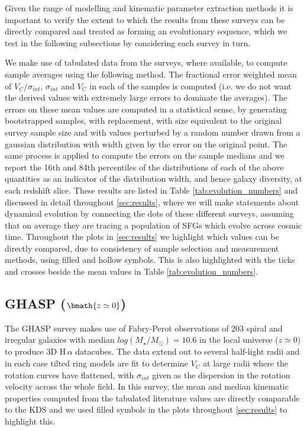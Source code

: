 \documentclass[fleqn,usenatbib]{mnras}
\begin{document}
Given the range of modelling and kinematic parameter extraction methods it is important to verify the extent to which the results from these surveys can be directly compared and treated as forming an evolutionary sequence, which we test in the following subsections by considering each survey in turn.

We make use of tabulated data from the surveys, where available, to compute sample averages using the following method. 
The fractional error weighted mean of $V_{C}/\sigma_{int}$, $\sigma_{int}$ and $V_{C}$ in each of the samples is computed (i.e. we do not want the derived values with extremely large errors to dominate the averages).
The errors on these mean values are computed in a statistical sense, by generating bootstrapped samples, with replacement, with size equivalent to the original survey sample size and with values perturbed by a random number drawn from a gaussian distribution with width given by the error on the original point.
The same process is applied to compute the errors on the sample medians and we report the 16th and 84th percentiles of the distributions of each of the above quantities as an indicator of the distribution width, and hence galaxy diversity, at each redshift slice.
These results are listed in Table \ref{tab:evolution_numbers} and discussed in detail throughout \cref{sec:results}, where we will make statements about dynamical evolution by connecting the dots of these different surveys, assuming that on average they are tracing a population of SFGs which evolve across cosmic time.
Throughout the plots in \cref{sec:results} we highlight which values can be directly compared, due to consistency of sample selection and measurement methods, using filled and hollow symbols.
This is also highlighted with the ticks and crosses beside the mean values in Table \ref{tab:evolution_numbers}. 

\subsection{GHASP ($\bmath{z\simeq0}$)}\label{subsec:GHASP}
The GHASP survey \citep[E08]{Epinat2008a,Epinat2008} makes use of Fabry-Perot observations of 203 spiral and irregular galaxies with median $log(M_{\star}/M_{\odot})=10.6$ in the local universe ($z\simeq0$) to produce 3D H$\,\alpha$ datacubes.
The data extend out to several half-light radii and in each case tilted ring models are fit to determine $V_{C}$ at large radii where the rotation curves have flattened, with $\sigma_{int}$ given as the dispersion in the rotation velocity across the whole field.
In this survey, the mean and median kinematic properties computed from the tabulated literature values are directly comparable to the KDS and we used filled symbols in the plots throughout \cref{sec:results} to highlight this.
\end{document}
